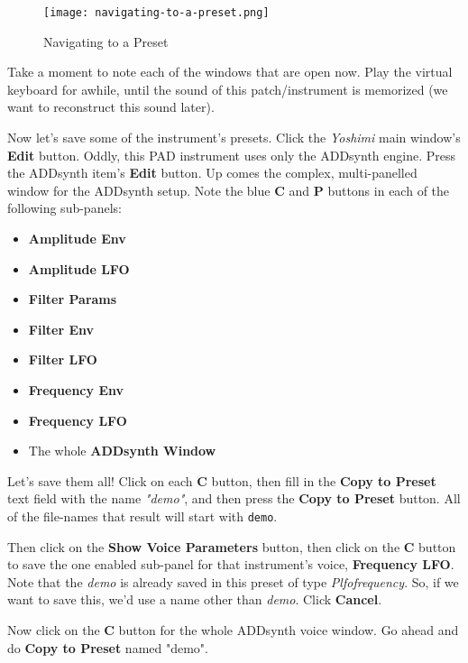 \begin{figure}[H]
   \centering 
   \texttt{[image: navigating-to-a-preset.png]}
   \caption{Navigating to a Preset}
   \label{fig:presets_navigating_to_a_preset}
\end{figure}

   Take a moment to note each of the windows that are open now.
   Play the virtual keyboard for awhile, until the sound of this
   patch/instrument is memorized (we want to reconstruct this sound later).

   Now let's save some of the instrument's presets.
   Click the \textsl{Yoshimi} main window's \textbf{Edit} button.
   Oddly, this PAD instrument uses only the ADDsynth engine.
   Press the ADDsynth item's \textbf{Edit} button.
   Up comes the complex, multi-panelled window for the ADDsynth setup.
   Note the blue \textbf{C} and \textbf{P} buttons in each of the following
   sub-panels:

   \begin{itemize}
      \item \textbf{Amplitude Env}
      \item \textbf{Amplitude LFO}
      \item \textbf{Filter Params}
      \item \textbf{Filter Env}
      \item \textbf{Filter LFO}
      \item \textbf{Frequency Env}
      \item \textbf{Frequency LFO}
      \item The whole \textbf{ADDsynth Window}
   \end{itemize}

   Let's save them all!  Click on each \textbf{C} button,
   then fill in the \textbf{Copy to Preset} text field with
   the name \textsl{"demo"}, and then press the \textbf{Copy to Preset}
   button.  All of the file-names that result will start with
   \texttt{demo}.

   Then click on the \textbf{Show Voice Parameters} button,
   then click on the \textbf{C} button to save the one enabled sub-panel
   for that instrument's voice, \textbf{Frequency LFO}.
   Note that the \textsl{demo} is already saved in this preset of
   type \textsl{Plfofrequency}.  So, if we want to save this, we'd use a
   name other than \textsl{demo}.  Click \textbf{Cancel}.

   Now click on the \textbf{C} button
   for the whole ADDsynth voice window.  Go ahead and do
   \textbf{Copy to Preset} named "demo".

